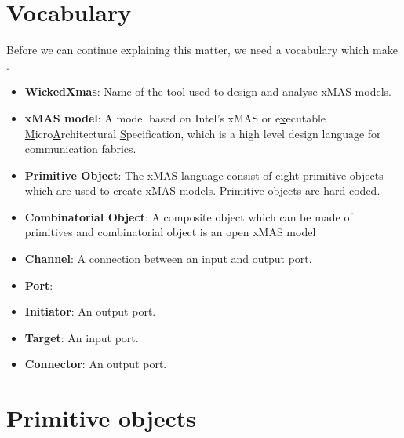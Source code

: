 \documentclass[a4paper,11pt,final]{article}
\begin{document}
\section{Vocabulary} 
Before we can continue explaining this matter, we need a vocabulary which make . 
\begin{itemize}
\item \textbf{WickedXmas}: Name of the tool used to design and analyse xMAS models.
\item \textbf{xMAS model}: A model based on Intel's xMAS or e\underline{x}ecutable \underline{M}icro\underline{A}rchitectural \underline{S}pecification, which is a high level design language for communication fabrics. 
\item \textbf{Primitive Object}: The xMAS language consist of eight primitive objects which are used to create xMAS models. Primitive objects are hard coded.
\item \textbf{Combinatorial Object}: A composite object which can be made of primitives and combinatorial object is an open xMAS model
\item \textbf{Channel}: A connection between an input and output port.
\item \textbf{Port}: 

\item \textbf{Initiator}: An output port.
\item \textbf{Target}: An input port.
\item \textbf{Connector}: An output port.


\end{itemize}



\section{Primitive objects}
   
\end{document}
